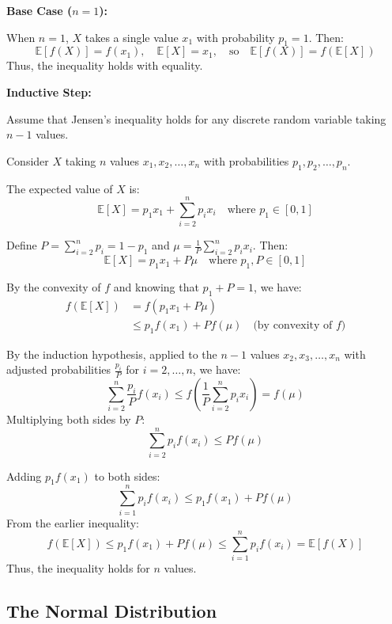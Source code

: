 \smallskip \textbf{Base Case (\( n = 1 \)):} \smallskip

When \( n = 1 \), \( X \) takes a single value \( x_1 \) with probability \( p_1 = 1 \). Then:
\[
    \mathbb{E}[f(X)] = f(x_1), \quad \mathbb{E}[X] = x_1, \quad \text{so} \quad \mathbb{E}[f(X)] = f(\mathbb{E}[X])
\]
Thus, the inequality holds with equality.

\smallskip \textbf{Inductive Step:} \smallskip

Assume that Jensen's inequality holds for any discrete random variable taking \( n-1 \) values.

Consider \( X \) taking \( n \) values \( x_1, x_2, \dots, x_n \) with probabilities \( p_1, p_2, \dots, p_n \).

The expected value of \( X \) is:
\[
    \mathbb{E}[X] = p_1x_1 + \sum_{i=2}^{n} p_i x_i \quad \text{where } p_1 \in [0, 1]
\]

Define \( P = \sum_{i=2}^{n} p_i = 1 - p_1 \) and \( \mu = \frac{1}{P} \sum_{i=2}^{n} p_i x_i \). Then:
\[
    \mathbb{E}[X] = p_1 x_1 + P \mu \quad \text{where } p_1, P \in [0, 1]
\]

By the convexity of \( f \) and knowing that \( p_1 + P = 1 \), we have:
\begin{align*}
    f(\mathbb{E}[X]) &= f(p_1 x_1 + P \mu) \\
    &\leq p_1 f(x_1) + P f(\mu) \quad \text{(by convexity of } f\text{)}
\end{align*}

By the induction hypothesis, applied to the \( n-1 \) values \( x_2, x_3, \dots, x_n \) with adjusted probabilities \( \frac{p_i}{P} \) for \( i = 2, \dots, n \), we have:
\[
    \sum_{i=2}^{n} \frac{p_i}{P} f(x_i) \leq f\left( \frac{1}{P} \sum_{i=2}^{n} p_i x_i \right) = f(\mu)
\]
Multiplying both sides by \( P \):
\[
    \sum_{i=2}^{n} p_i f(x_i) \leq P f(\mu)
\]

Adding \( p_1 f(x_1) \) to both sides:
\[
    \sum_{i=1}^{n} p_i f(x_i) \leq p_1 f(x_1) + P f(\mu)
\]
From the earlier inequality:
\[
    f(\mathbb{E}[X]) \leq p_1 f(x_1) + P f(\mu) \leq \sum_{i=1}^{n} p_i f(x_i) = \mathbb{E}[f(X)]
\]
Thus, the inequality holds for \( n \) values.





\subsection{The Normal Distribution}

